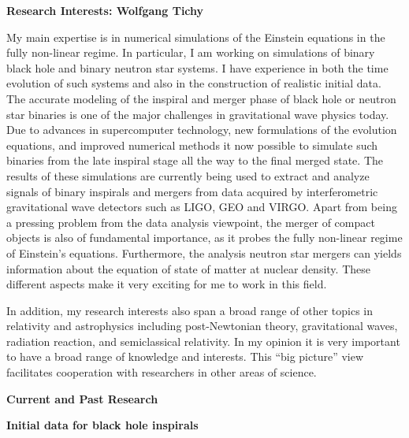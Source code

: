 \documentclass[11pt]{article}
\begin{document}
\begin{spacing}{0.95} 


\centerline{\bf \Large Research Interests: Wolfgang Tichy}
\bigskip

My main expertise is in numerical simulations of the Einstein equations in
the fully non-linear regime. In particular, I am working on simulations of
binary black hole and binary neutron star systems. 
I have experience in both the time evolution of
such systems and also in the construction of realistic initial data.
The accurate modeling of the inspiral and merger phase of black hole 
or neutron star binaries is one of the
major challenges in gravitational wave physics today.
Due to advances in supercomputer technology,
new formulations of the evolution equations,
and improved numerical methods it now possible to simulate
such binaries from the late inspiral stage all the way to 
the final merged state. The results of
these simulations are currently being used to extract and analyze signals of
binary inspirals and mergers from data acquired by
interferometric gravitational wave detectors such as LIGO, GEO and VIRGO.
Apart from being a pressing problem from the data analysis viewpoint, 
the merger of compact objects is also of fundamental importance,
as it probes the fully non-linear regime of Einstein's equations.
Furthermore, the analysis neutron star mergers can yields information
about the equation of state of matter at nuclear density.
These different aspects make it very
exciting for me to work in this field.

In addition, my research interests also span a broad range of other topics
in relativity and astrophysics including post-Newtonian theory,
gravitational waves, radiation reaction, and semiclassical relativity. In my
opinion it is very important to have a broad range of knowledge and
interests.  This ``big picture'' view facilitates cooperation with
researchers in other areas of science.




\medskip
\bigskip
\centerline{\bf \large Current and Past Research}
\medskip %


\noindent
{\bf Initial data for black hole inspirals }
\smallskip


\end{spacing}
\end{document}
